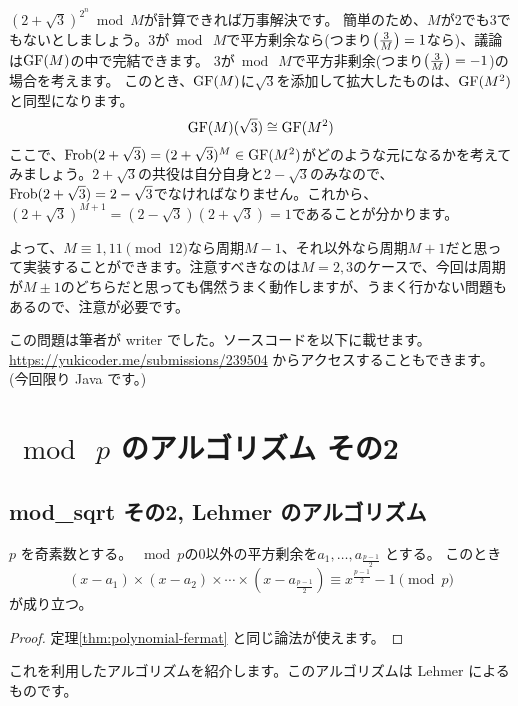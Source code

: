 \documentclass{jsarticle}
\begin{document}
  $(2+\sqrt{3})^{2^n} \bmod M$が計算できれば万事解決です。
  簡単のため、$M$が2でも3でもないとしましょう。3が$\bmod\ M$で平方剰余なら(つまり$\left(\frac{3}{M}\right)=1$なら)、議論は$\mathrm{GF}(M)$の中で完結できます。
  3が$\bmod\ M$で平方非剰余(つまり$\left(\frac{3}{M}\right)=-1$)の場合を考えます。
  このとき、$\mathrm{GF}(M)$に$\sqrt{3}$を添加して拡大したものは、$\mathrm{GF}(M^2)$と同型になります。
  \begin{displaymath}
   \mathrm{GF}(M)(\sqrt{3}) \cong \mathrm{GF}(M^2)
  \end{displaymath}
  ここで、$\mathrm{Frob}(2+\sqrt{3}) = (2+\sqrt{3})^M \in \mathrm{GF}(M^2)$がどのような元になるかを考えてみましょう。$2+\sqrt{3}$の共役は自分自身と$2-\sqrt{3}$のみなので、$\mathrm{Frob}(2+\sqrt{3})=2-\sqrt{3}$でなければなりません。これから、$(2+\sqrt{3})^{M+1}=(2-\sqrt{3})(2+\sqrt{3})=1$であることが分かります。

  よって、$M \equiv 1, 11 \pmod{12}$なら周期$M-1$、それ以外なら周期$M + 1$だと思って実装することができます。注意すべきなのは$M = 2,3$のケースで、今回は周期が$M \pm 1$のどちらだと思っても偶然うまく動作しますが、うまく行かない問題もあるので、注意が必要です。

  この問題は筆者が writer でした。ソースコードを以下に載せます。\url{https://yukicoder.me/submissions/239504} からアクセスすることもできます。 (今回限り Java です。)
  
 \section{$\bmod\ p$ のアルゴリズム その2}
 \label{sec:mod-p-2}
  \subsection{mod\_sqrt その2, Lehmer のアルゴリズム}
  \label{subsec:karp-mod-sqrt}
  \begin{theorem}
   \label{thm:quadratic-residue-fermat}
   $p$ を奇素数とする。
   ${} \bmod p$の0以外の平方剰余を$a_1, \ldots, a_{\frac{p-1}{2}}$ とする。
   このとき
   \begin{displaymath}
    (x - a_1) \times (x - a_2) \times \cdots \times (x - a_{\frac{p-1}{2}})
    \equiv x^{\frac{p-1}{2}}-1 \pmod p
   \end{displaymath}
   が成り立つ。
  \end{theorem}
  \begin{proof}
   定理\ref{thm:polynomial-fermat} と同じ論法が使えます。
  \end{proof}
  これを利用したアルゴリズムを紹介します。このアルゴリズムは Lehmer によるものです。
\end{document}

